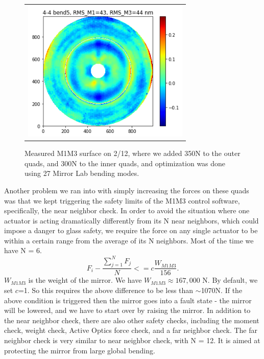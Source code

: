 \documentclass [twoside,openbib,12pt]{article}
\newcommand{\beq}{\begin{equation}}
\newcommand{\eeq}{\end{equation}}
\begin{document}
 \begin{figure}[bthp]
   \begin{center}
     \begin{tabular}{c}
\includegraphics[width=80mm]{figures/quadsUp.png}
  \end{tabular}
   \end{center}
   \caption
   { \label{fig:quadsUp}
     Measured M1M3 surface on 2/12, where we added 350N to the outer
     quads, and 300N to the inner quads, and optimization was done using 27 Mirror
     Lab bending modes.
 }
\end{figure}

Another problem we ran into with simply increasing the forces on these
quads was that we kept triggering the safety limits of the M1M3
control software, specifically, the near neighbor check.
In order to avoid the situation where one actuator is acting
dramatically differently from its N near neighbors, which could
impose a danger to glass safety, we require the
force on any single actuator to be within a certain range from the
average of its N neighbors. Most of the time we have N = 6.
\beq
F_i - \frac{\sum_{j=1}^{N} F_j}{N} <= c \frac{W_{M1M3}}{156}.
\eeq
$W_{M1M3} $ is the weight of the mirror. We have $W_{M1M3} \approx 167,000$ N. By default, we set $c$=1.
So this requires the above difference to be less than $\sim$1070N.
If the above condition is triggered then the mirror goes into a fault
state - the mirror will be lowered, and we have to start over by
raising the mirror.
In addition to the near neighbor check, there are also other safety
checks, including the moment check, weight check, Active Optics force
check, and a far neighbor check. The far neighbor check is very similar to near neighbor
check, with N = 12. It is aimed at protecting the mirror from large
global bending.
\end{document}
